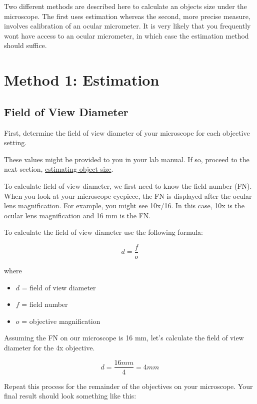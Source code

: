 \documentclass[
]{book}
\providecommand{\tightlist}{%
  \setlength{\itemsep}{0pt}\setlength{\parskip}{0pt}}
\begin{document}
Two different methods are described here to calculate an object\textquotesingle s size under the microscope. The first uses estimation whereas the second, more precise measure, involves calibration of an ocular micrometer. It is very likely that you frequently won\textquotesingle t have access to an ocular micrometer, in which case the estimation method should suffice.

\hypertarget{method-1-estimation}{%
\section{Method 1: Estimation}\label{method-1-estimation}}

\hypertarget{field-of-view-diameter}{%
\subsection*{Field of View Diameter}\label{field-of-view-diameter}}

First, determine the field of view diameter of your microscope for each objective setting.

These values might be provided to you in your lab manual. If so, proceed to the next section, \protect\hyperlink{estimating-object-size}{estimating object size}.

To calculate field of view diameter, we first need to know the field number (FN). When you look at your microscope eyepiece, the FN is displayed after the ocular lens magnification. For example, you might see 10x/16. In this case, 10x is the ocular lens magnification and 16 mm is the FN.

To calculate the field of view diameter use the following formula:

\[d = \frac{f}{o}\]

where

\begin{itemize}
\tightlist
\item
  \(d\) = field of view diameter
\item
  \(f\) = field number
\item
  \(o\) = objective magnification
\end{itemize}

Assuming the FN on our microscope is 16 mm, let's calculate the field of view diameter for the 4x objective.

\[d = \frac{16 mm}{4} = 4 mm\]

Repeat this process for the remainder of the objectives on your microscope. Your final result should look something like this:
\end{document}
